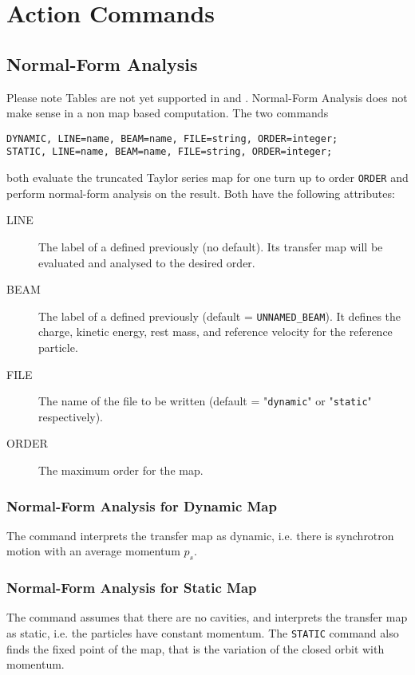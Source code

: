 \chapter{Action Commands}
\label{chp:action}

\section{Normal-Form Analysis}
Please note Tables are not yet supported in \noopalt and \noopalcycl . Normal-Form Analysis does not make sense in a non map based computation. 
The two commands
\begin{verbatim}
DYNAMIC, LINE=name, BEAM=name, FILE=string, ORDER=integer;
STATIC, LINE=name, BEAM=name, FILE=string, ORDER=integer;
\end{verbatim}
both evaluate the truncated Taylor series map for one turn up to order
\texttt{ORDER} and perform normal-form analysis on the result.
Both have the following attributes:
\begin{description}
\item[LINE]
The label of a  defined
previously (no default).  Its transfer map will be evaluated and
analysed to the desired order.
\item[BEAM]
The label of a  defined
previously (default = \texttt{UNNAMED\_BEAM}).
It defines the charge, kinetic energy, rest mass,
and reference velocity for the reference
particle. 
\item[FILE]
The name of the file to be written 
(default = "\texttt{dynamic}" or "\texttt{static}" respectively).
\item[ORDER]
The maximum order for the map.
\end{description}

\subsection{Normal-Form Analysis for Dynamic Map}
\label{sec:dynamic}
The command interprets the transfer map as dynamic,
i.e. there is synchrotron motion with an average momentum $p_s$.

\subsection{Normal-Form Analysis for Static Map}
\label{sec:static}
The command assumes that there are no cavities,
and interprets the transfer map as static,
i.e. the particles have constant momentum.
The \texttt{STATIC} command also finds the fixed point of the map,
that is the variation of the closed orbit with momentum.
